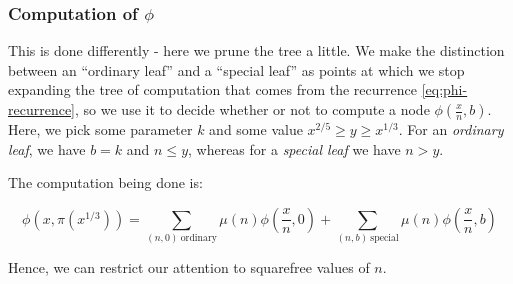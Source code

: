 \documentclass[12pt]{article}
\begin{document}
%
%
%

\subsubsection{Computation of $\phi$}
This is done differently - here we prune the tree a little. We make the distinction between an ``ordinary leaf'' and a ``special leaf'' as
points at which we stop expanding the tree of computation that comes from the recurrence \eqref{eq:phi-recurrence}, so we use it to
decide whether or not to compute a node $\phi\left(\frac{x}{n},b\right)$.
Here, we pick some parameter $k$ and some value $x^{2/5} \geq y \geq x^{1/3}$. For an \emph{ordinary leaf}, we have
$b=k$ and $n\leq y$, whereas for a \emph{special leaf} we have $n > y$.

The computation being done is:

$$\phi\left(x,\pi\left(x^{1/3}\right)\right) = \sum_{(n,0)\ \mathrm{ordinary}}\mu(n)\phi\left(\frac{x}{n},0\right) +
                        \sum_{(n,b)\ \mathrm{special}}\mu(n)\phi\left(\frac{x}{n},b\right)$$

Hence, we can restrict our attention to squarefree values of $n$.
\end{document}
